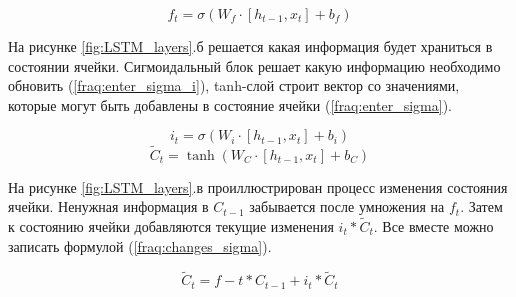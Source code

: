\documentclass[a4paper,14pt]{article}
\begin{document}
\begin{equation}
	f_t = \sigma(W_f\cdot[h_{t-1},x_t] + b_f)
	\label{fraq:forget}
\end{equation}

На рисунке \ref{fig:LSTM_layers}.б решается какая информация будет храниться в состоянии ячейки.
Сигмоидальный блок решает какую информацию необходимо обновить (\ref{fraq:enter_sigma_i}), tanh-слой строит вектор со значениями, которые могут быть добавлены в состояние ячейки (\ref{fraq:enter_sigma}). 

\begin{equation}
	i_t = \sigma(W_i\cdot[h_{t-1},x_t] + b_i) 
	\label{fraq:enter_sigma_i}
\end{equation}
\begin{equation}
	\tilde C_t = \tanh(W_C\cdot[h_{t-1},x_t] + b_C)
	\label{fraq:enter_sigma}
\end{equation}

На рисунке \ref{fig:LSTM_layers}.в проиллюстрирован процесс изменения состояния ячейки.
Ненужная информация в $C_{t-1}$ забывается после умножения на $f_t$.
Затем к состоянию ячейки добавляются текущие изменения $i_t * \tilde C_t$.
Все вместе можно записать формулой (\ref{fraq:changes_sigma}).

\begin{equation}
	\tilde C_t = f-t * C_{t-1} + i_t * \tilde C_t
	\label{fraq:changes_sigma}
\end{equation}
\end{document}

